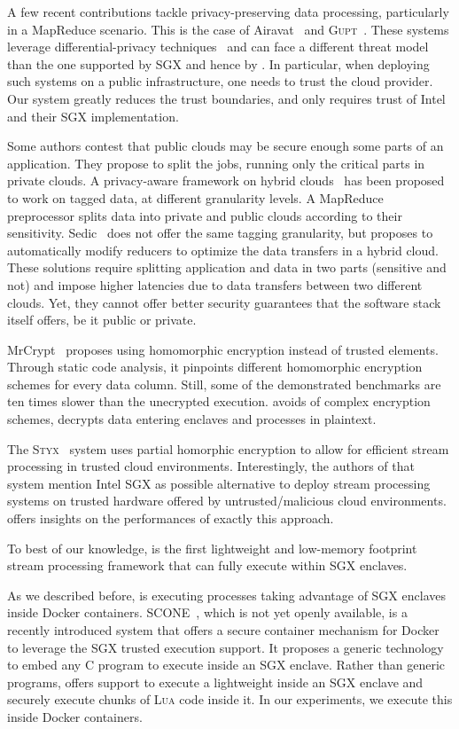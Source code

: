 A few recent contributions tackle privacy-preserving data processing, particularly in a MapReduce scenario.
This is the case of Airavat~\cite{Roy:2010:ASP:1855711.1855731} and \textsc{Gupt}~\cite{Mohan:2012:GPP:2213836.2213876}.
These systems leverage differential-privacy techniques~\cite{dwork2006calibrating} and can face a different threat model than the one supported by SGX and hence by \SS.
In particular, when deploying such systems on a public infrastructure, one needs to trust the cloud provider.
Our system greatly reduces the trust boundaries, and only requires trust of Intel{\textregistered} and their SGX implementation.

Some authors contest that public clouds may be secure enough some parts of an application.
They propose to split the jobs, running only the critical parts in private clouds.
A privacy-aware framework on hybrid clouds~\cite{xu2015framework} has been proposed to work on tagged data, at different granularity levels.
A MapReduce preprocessor splits data into private and public clouds according to their sensitivity.
Sedic~\cite{zhang2011sedic} does not offer the same tagging granularity, but proposes to automatically modify reducers to optimize the data transfers in a hybrid cloud.
These solutions require splitting application and data in two parts (sensitive and not) and impose higher latencies due to data transfers between two different clouds.
Yet, they cannot offer better security guarantees that the software stack itself offers, be it public or private.

MrCrypt~\cite{tetali2013mrcrypt} proposes using homomorphic encryption instead of trusted elements.
Through static code analysis, it pinpoints different homomorphic encryption schemes for every data column.
Still, some of the demonstrated benchmarks are ten times slower than the unecrypted execution.
\SS{} avoids of complex encryption schemes, decrypts data entering enclaves and processes in plaintext.

The \textsc{Styx}~\cite{Stephen:2016:SSP:2987550.2987574} system uses partial homorphic encryption to allow for efficient stream processing in trusted cloud environments.
Interestingly, the authors of that system mention Intel{\textregistered} SGX as possible alternative to deploy stream processing systems on trusted hardware offered by untrusted/malicious cloud environments.
\SS{} offers insights on the performances of exactly this approach.

To best of our knowledge, \SS{} is the first lightweight and low-memory footprint stream processing framework that can fully execute within SGX enclaves.

As we described before, \SS{} is executing processes taking advantage of SGX enclaves inside Docker containers.
\textsc{SCONE}~\cite{pietzuch_scone:_nodate}, which is not yet openly available, is a recently introduced system that offers a secure container mechanism for Docker to leverage the SGX trusted execution support.
It proposes a generic technology to embed any C program to execute inside an SGX enclave.
Rather than generic programs, \SS{} offers support to execute a lightweight \luavm{} inside an SGX enclave and securely execute chunks of \textsc{Lua} code inside it.
In our experiments, we execute this \luavm{} inside Docker containers.
